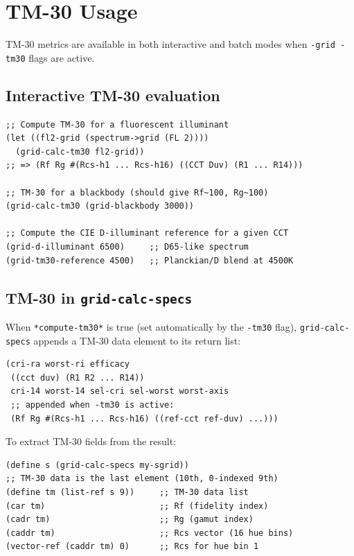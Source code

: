 \documentclass[11pt]{article}
\newcommand{\cmd}[1]{\texttt{#1}}
\begin{document}
\section{TM-30 Usage}
\label{sec:tm30-access}

TM-30 metrics are available in both interactive and batch modes when
\cmd{-grid -tm30} flags are active.

\subsection{Interactive TM-30 evaluation}

\begin{lstlisting}[style=scheme]
;; Compute TM-30 for a fluorescent illuminant
(let ((fl2-grid (spectrum->grid (FL 2))))
  (grid-calc-tm30 fl2-grid))
;; => (Rf Rg #(Rcs-h1 ... Rcs-h16) ((CCT Duv) (R1 ... R14)))

;; TM-30 for a blackbody (should give Rf~100, Rg~100)
(grid-calc-tm30 (grid-blackbody 3000))

;; Compute the CIE D-illuminant reference for a given CCT
(grid-d-illuminant 6500)     ;; D65-like spectrum
(grid-tm30-reference 4500)   ;; Planckian/D blend at 4500K
\end{lstlisting}

\subsection{TM-30 in \texttt{grid-calc-specs}}

When \cmd{*compute-tm30*} is true (set automatically by the \cmd{-tm30}
flag), \cmd{grid-calc-specs} appends a TM-30 data element to its
return list:

\begin{lstlisting}[style=scheme]
(cri-ra worst-ri efficacy
 ((cct duv) (R1 R2 ... R14))
 cri-14 worst-14 sel-cri sel-worst worst-axis
 ;; appended when -tm30 is active:
 (Rf Rg #(Rcs-h1 ... Rcs-h16) ((ref-cct ref-duv) ...)))
\end{lstlisting}

To extract TM-30 fields from the result:

\begin{lstlisting}[style=scheme]
(define s (grid-calc-specs my-sgrid))
;; TM-30 data is the last element (10th, 0-indexed 9th)
(define tm (list-ref s 9))     ;; TM-30 data list
(car tm)                       ;; Rf (fidelity index)
(cadr tm)                      ;; Rg (gamut index)
(caddr tm)                     ;; Rcs vector (16 hue bins)
(vector-ref (caddr tm) 0)      ;; Rcs for hue bin 1
\end{lstlisting}
\end{document}

